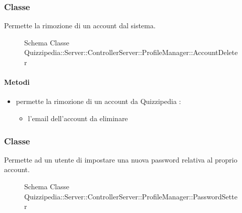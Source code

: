 \subsubsection{Classe }
Permette la rimozione di un account dal sistema.
\begin{figure}[H]
\centering
\noindent{}
\caption[Schema Classe AccountDeleter]{Schema Classe Quizzipedia::Server::ControllerServer::ProfileManager::AccountDeleter}
\end{figure}
\paragraph{Metodi}
\begin{itemize}
\item {}
\newline
permette la rimozione di un account da Quizzipedia
\newline
{} :
\begin{itemize}
\item {}
\newline
l'email dell'account da eliminare
\end{itemize}
\end{itemize}
\subsubsection{Classe }
Permette ad un utente di impostare una nuova password relativa al proprio account.
\begin{figure}[H]
\centering
\noindent{}
\caption[Schema Classe PasswordSetter]{Schema Classe Quizzipedia::Server::ControllerServer::ProfileManager::PasswordSetter}
\end{figure}

